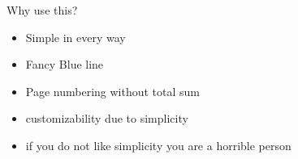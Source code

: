 \begin{frame}[t]{Why use this?}
    \begin{itemize}
        \item[\cmark] Simple in every way
        \item[\cmark] Fancy Blue line
        \item[\cmark] Page numbering without total sum
        \item[\cmark] customizability due to simplicity
        \item[\xmark] if you do not like simplicity you are a horrible person
    \end{itemize}
\end{frame}
